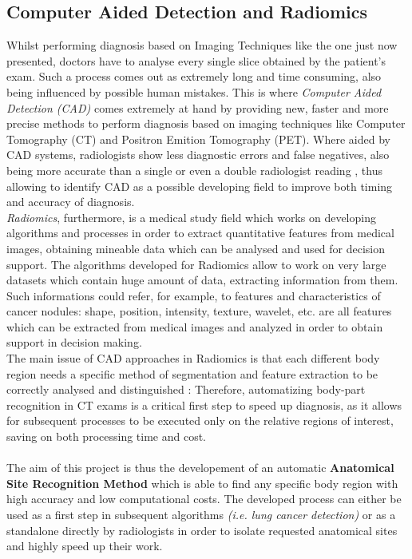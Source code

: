 \documentclass[../main.tex]{subfiles}
\begin{document}
\subsection{Computer Aided Detection and Radiomics}
Whilst performing diagnosis based on Imaging Techniques like the one just now presented, doctors have to analyse every single slice obtained by the patient's exam. Such a process comes out as extremely long and time consuming, also being influenced by possible human mistakes. This is where \textit{Computer Aided Detection (CAD)} comes extremely at hand by providing new, faster and more precise methods to perform diagnosis based on imaging techniques like Computer Tomography (CT) and Positron Emition Tomography (PET). Where aided by CAD systems, radiologists show less diagnostic errors and false negatives, also being more accurate than a single or even a double radiologist reading \cite{AlMohammad2017}, thus allowing to identify CAD as a possible developing field to improve both timing and accuracy of diagnosis.\\
\textit{Radiomics}, furthermore, is a medical study field which works on developing algorithms and processes in order to extract quantitative features from medical images, obtaining mineable data which can be analysed and used for decision support. \cite{Gillies2016} The algorithms developed for Radiomics allow to work on very large datasets which contain huge amount of data, extracting information from them. Such informations could refer, for example, to features and characteristics of cancer nodules: shape, position, intensity, texture, wavelet, etc. are all features which can be extracted from medical images and analyzed in order to obtain support in decision making. \cite{Chen2017}\\
The main issue of CAD approaches in Radiomics is that each different body region needs a specific method of segmentation and feature extraction to be correctly analysed and distinguished \cite{Yan2016}: Therefore, automatizing body-part recognition in CT exams is a critical first step to speed up diagnosis, as it allows for subsequent processes to be executed only on the relative regions of interest, saving on both processing time and cost.\\
\\
The aim of this project is thus the developement of an automatic \textbf{Anatomical Site Recognition Method} which is able to find any specific body region with high accuracy and low computational costs. The developed process can either be used as a first step in subsequent algorithms \textit{(i.e. lung cancer detection)} or as a standalone directly by radiologists in order to isolate requested anatomical sites and highly speed up their work.
\end{document}
